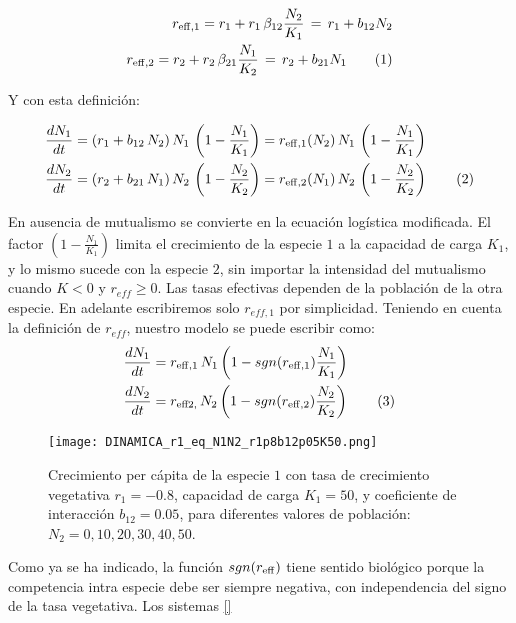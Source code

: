\begin{align*}
\displaystyle r_{\rm{eff},1}=r_1 + r_1\, \beta_{12} \frac{N_2}{K_1}\, =\, r_1 + b_{12}N_2  \\
\displaystyle r_{\rm{eff},2}=r_2 + r_2\, \beta_{21} \frac{N_1}{K_2}\, =\, r_2 + b_{21}N_1 \stepcounter{equation}
\tag{\theequation}
\end{align*}

Y con esta definición:

\begin{align*}
\displaystyle & \frac{dN_1}{dt}= (r_1 + b_{12}\, N_2) \, N_1\,\left(1-\frac{N_1}{K_1}\right)=r_{\rm{eff},1}(N_2)\,N_1\,\left(1-\frac{N_1}{K_1}\right) \\
\displaystyle & \frac{dN_2}{dt}= (r_2 + b_{21}\, N_1) \, N_2\,\left(1-\frac{N_2}{K_2}\right)=r_{\rm{eff},2}(N_1)\,N_2\,\left(1-\frac{N_2}{K_2}\right)
\stepcounter{equation}\tag{\theequation}
\label{eq:May_reff}
\end{align*}

En ausencia de mutualismo se convierte en la ecuación logística modificada. El factor $\left(1-\frac{N_{1}}{K_{1}}\right)$ limita el crecimiento de la especie $1$ a la capacidad de carga $K_{1}$, y lo mismo sucede con la especie $2$, sin importar la intensidad del mutualismo cuando $K < 0$ y $r_{eff} \geq 0$. Las tasas efectivas dependen de la población de la otra especie. En adelante escribiremos solo $r_{eff,1}$ por simplicidad. Teniendo en cuenta la definición de $r_{eff}$, nuestro modelo se puede escribir como:
\begin{align*}
\displaystyle & \frac{dN_1}{dt}= r_{\rm{eff},1}\, N_1 \left(1-sgn(r_{\rm{eff},1})\frac{N_1}{K_1}\right)\\
\displaystyle & \frac{dN_2}{dt}= r_{\rm{eff2},}\, N_2 \left(1-sgn(r_{\rm{eff},2})\frac{N_2}{K_2}\right)
\stepcounter{equation}\tag{\theequation}\label{eq:new_model}
\end{align*}


\begin{figure}[t]
\centering
\texttt{[image: DINAMICA\_r1\_eq\_N1N2\_r1p8b12p05K50.png]}
\caption{Crecimiento per cápita de la especie $1$ con tasa de crecimiento vegetativa $r_1=-0.8$, capacidad de carga $K_1=50$, y coeficiente de interacción $b_{12}=0.05$, para diferentes valores de población: $N_2=0,10,20,30,40,50$.}
\label{fig:per capita_growth_rate_mutualism}
\end{figure}

Como ya se ha indicado, la función $sgn(r_{\rm{eff}})$ tiene sentido biológico porque la competencia intra especie debe ser siempre negativa, con independencia del signo de la tasa vegetativa. Los sistemas \ref{}

